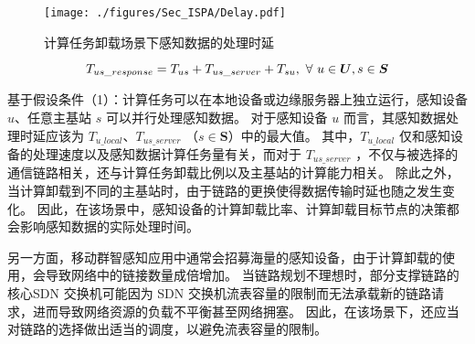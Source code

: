 \begin{figure}[!t]
  \centering
  \texttt{[image: ./figures/Sec\_ISPA/Delay.pdf]}
  \vspace{-0.5em}
  \caption{计算任务卸载场景下感知数据的处理时延}
  \label{fig_timestaps}
\end{figure}

\vspace{-1em}
\begin{equation}
  \label{formula_cloudtime}
    {T}_{us\_response} = T_{us} + T_{us\_server} + T_{su},\ \forall \ u \in \boldsymbol{U}, s \in \boldsymbol{S}
\end{equation}

基于假设条件（1）：计算任务可以在本地设备或边缘服务器上独立运行，感知设备 $u$、任意主基站 $s$ 可以并行处理感知数据。
对于感知设备 $u$ 而言，其感知数据处理时延应该为 $T_{u\_local}$、$T_{us\_server}$ （$s \in \boldsymbol{S}$）中的最大值。
其中，$T_{u\_local}$ 仅和感知设备的处理速度以及感知数据计算任务量有关，而对于 $T_{us\_server}$ ，不仅与被选择的通信链路相关，还与计算任务卸载比例以及主基站的计算能力相关。
除此之外，当计算卸载到不同的主基站时，由于链路的更换使得数据传输时延也随之发生变化。
因此，在该场景中，感知设备的计算卸载比率、计算卸载目标节点的决策都会影响感知数据的实际处理时间。

另一方面，移动群智感知应用中通常会招募海量的感知设备，由于计算卸载的使用，会导致网络中的链接数量成倍增加。
当链路规划不理想时，部分支撑链路的核心SDN 交换机可能因为 SDN 交换机流表容量的限制而无法承载新的链路请求，进而导致网络资源的负载不平衡甚至网络拥塞。
因此，在该场景下，还应当对链路的选择做出适当的调度，以避免流表容量的限制。


